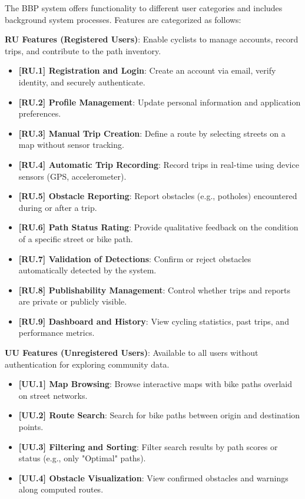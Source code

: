 The BBP system offers functionality to different user categories and includes background system processes. Features are categorized as follows:

\textbf{RU Features (Registered Users)}: Enable cyclists to manage accounts, record trips, and contribute to the path inventory.

\begin{itemize}
    \item \textbf{[RU.1] Registration and Login}: Create an account via email, verify identity, and securely authenticate.
    \item \textbf{[RU.2] Profile Management}: Update personal information and application preferences.
    \item \textbf{[RU.3] Manual Trip Creation}: Define a route by selecting streets on a map without sensor tracking.
    \item \textbf{[RU.4] Automatic Trip Recording}: Record trips in real-time using device sensors (GPS, accelerometer).
    \item \textbf{[RU.5] Obstacle Reporting}: Report obstacles (e.g., potholes) encountered during or after a trip.
    \item \textbf{[RU.6] Path Status Rating}: Provide qualitative feedback on the condition of a specific street or bike path.
    \item \textbf{[RU.7] Validation of Detections}: Confirm or reject obstacles automatically detected by the system.
    \item \textbf{[RU.8] Publishability Management}: Control whether trips and reports are private or publicly visible.
    \item \textbf{[RU.9] Dashboard and History}: View cycling statistics, past trips, and performance metrics.
\end{itemize}

\textbf{UU Features (Unregistered Users)}: Available to all users without authentication for exploring community data.

\begin{itemize}
    \item \textbf{[UU.1] Map Browsing}: Browse interactive maps with bike paths overlaid on street networks.
    \item \textbf{[UU.2] Route Search}: Search for bike paths between origin and destination points.
    \item \textbf{[UU.3] Filtering and Sorting}: Filter search results by path scores or status (e.g., only "Optimal" paths).
    \item \textbf{[UU.4] Obstacle Visualization}: View confirmed obstacles and warnings along computed routes.
\end{itemize}

